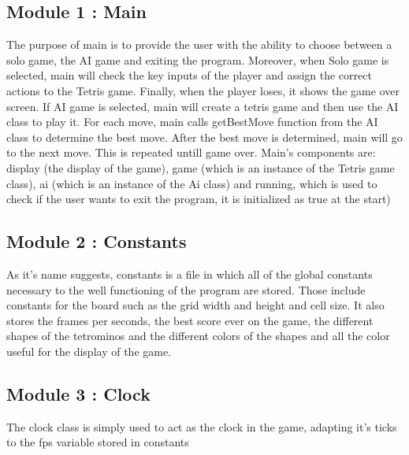 \documentclass[conference]{IEEEtran}
\begin{document}
\subsection{Module 1 : Main}
The purpose of main is to provide the user with the ability to choose between a solo game, the AI game and exiting the program. Moreover, when Solo game is selected, main will check the key inputs of the player and assign the correct actions to the Tetris game. Finally, when the player loses, it shows the game over screen. If AI game is selected, main will create a tetris game and then use the AI class to play it. For each move, main calls getBestMove function from the AI class to determine the best move. After the best move is determined, main will go to the next move. This is repeated untill game over.
Main's components are: display (the display of the game),  game (which is an instance of the Tetris game class), ai (which is an instance of the Ai class) and running, which is used to check if the user wants to exit the program, it is initialized as true at the start)

\subsection{Module 2 : Constants}
As it's name suggests, constants is a file in which all of the global constants necessary to the well functioning of the program are stored. Those include constants for the board such as the grid width and height and cell size. It also stores the frames per seconds, the best score ever on the game, the different shapes of the tetrominos and the different colors of the shapes and all the color useful for the display of the game.

\subsection{Module 3 : Clock}
The clock class is simply used to act as the clock in the game, adapting it's ticks to the fps variable stored in constants
\end{document}

